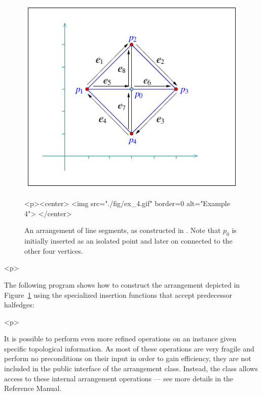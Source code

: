 \begin{ccAdvanced}
\begin{figure}[!htp]
\begin{ccTexOnly}
  \begin{center}
  \includegraphics{Arrangement_2/fig/ex_4}
  \end{center}
\end{ccTexOnly}
\begin{ccHtmlOnly}
  <p><center>
  <img src="./fig/ex_4.gif" border=0 alt="Example 4">
  </center>
\end{ccHtmlOnly}
\caption{An arrangement of line segments, as constructed in
. Note that $p_0$ is initially inserted as an
isolated point and later on connected to the other four vertices.}
\label{arr_fig:ex_4}
\end{figure}

\begin{ccHtmlOnly}<p>\end{ccHtmlOnly}
The following program shows how to construct the arrangement
depicted in Figure~\ref{arr_fig:ex_4} using the specialized
insertion functions that accept predecessor halfedges:


\begin{ccHtmlOnly}<p>\end{ccHtmlOnly}
It is possible to perform even more refined operations on an
 instance given specific topological information.
As most of these operations are very fragile and perform no preconditions
on their input in order to gain efficiency, they are not included in the
public interface of the arrangement class. Instead, the
 class allows access to these internal
arrangement operations --- see more details in the Reference Manual.
\end{ccAdvanced}

